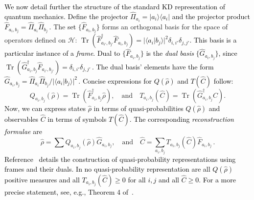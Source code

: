 \documentclass[%
 reprint,
superscriptaddress,
nofootinbib,
bibnotes,
 amsmath,amssymb,
 aps,
]{revtex4-1}
\theoremstyle{plain}
\DeclareMathOperator{\Tr}{Tr}
\newcommand*{\ketbra}[2]{\lvert #1 \rangle\!\langle #2 \rvert}
\newcommand{\Dave}[1]{\textcolor{black}{#1} }
\newcommand{\nicole}[1]{\textcolor{black}{#1} }
\newcommand{\Hcal}{{\mathcal H}}
\begin{document}
\Dave{We now detail further the structure of the standard KD representation of quantum mechanics.}
\nicole{Define the projector $\hat\Pi_{a_i} = \ketbra{a_i}{a_i}$ and the projector product}
\nicole{ $\hat F_{a_i, b_j}  =  \hat\Pi_{a_i}\hat\Pi_{b_j} \, .$  }
The \Dave{ set  
$\{ \hat F_{a_i, b_j} \}$} forms an orthogonal basis
for the space of operators defined on $\Hcal$:
\nicole{ $\Tr \left( \hat F^\dagger_{a_{i'}, b_{j'}} \hat F_{a_i, b_j} \right)
=|\langle a_i|b_j\rangle|^2\delta_{i,i'}\delta_{j,j'}.$ } 
\nicole{This  basis is a particular instance of a \emph{frame}.
}
\nicole{Dual to $ \{ \hat F_{a_i, b_j} \}$ is the \emph{dual basis} $\{ \hat{G}_{a_i, b_j} \}$, since }
\nicole{ $\Tr \left( \hat{G}^\dagger_{a_i, b_j}\hat F_{a_{i'}, b_{j'}} \right) 
=\delta_{i,i'}\delta_{j,j'} \, .$  }
\nicole{The dual basis' elements have the form}
\nicole{ $\hat{G}_{a_i, b_j}
=  \hat \Pi_{a_i}\hat\Pi_{b_j}  /  |\langle a_i|b_j\rangle|^2 \, .$  }
\nicole{Concise expressions for $Q(\hat \rho)$ and $T(\hat C)$ follow:}
\begin{equation} 
Q_{a_i,b_j}({\hat\rho})  
=  \Tr \left(\hat F^\dagger_{a_i, b_j}\hat \rho  \right) , 
\quad \text{and} \quad 
T_{a_i,b_j}({\hat C})
=  \Tr \left(\hat{G}^\dagger_{a_i, b_j}\hat C  \right).
\end{equation}
\nicole{Now, we can express states $\hat{\rho}$ in terms of quasi-probabilities $Q(\hat{\rho})$
and observables $\hat{C}$ in terms of symbols $T(\hat{C})$.
The corresponding \emph{reconstruction formulae} are}
\begin{equation}\label{eq:reconstruction2}
   \hat \rho=\sum Q_{a_i,b_j}({\hat \rho}) \hat G_{a_i, b_j},
   \quad \text{and} \quad
   \hat C = \sum_{a_i,b_j} T_{a_i,b_j}({\hat C}) \hat F_{a_i, b_j} \, .
\end{equation}
\nicole{Reference~\cite{Ferrie2011} details the construction of quasi-probability representations using frames  and their duals.
In no quasi-probability representation are all $Q(\hat\rho)$ positive measures and all $T_{a_i,b_j}(\hat C)\geq 0$ for all $i,j$ and all $\hat C\geq 0$. For a more precise statement, see, e.g., Theorem 4 of~\cite{Ferrie2011}.
}
\end{document}

